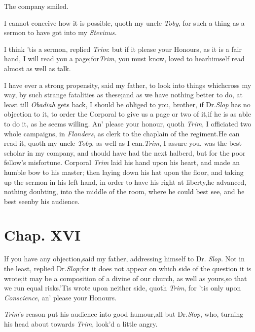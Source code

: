 \documentclass{article}
\begin{document}
The company smiled.

I cannot conceive how it is possible, quoth my uncle
\textit{Toby}, for such a thing as a sermon to have got into my
\textit{Stevinus.}

I think ’tis a sermon, replied \textit{Trim}:\tsk\break
but if it please your Honours, as it is a fair hand, I will read you a
page;\tsk for\break \textit{Trim}, you must know, loved to
hear\break himself
read almost as well as talk.

I have ever a strong propensity, said my father, to look into
things which\break cross my way, by such strange fatalities\break
as these;\tsk and as we have nothing better to do, at least
till \textit{Obadiah} gets back,\pb
I should be obliged to you, brother, if Dr.\@ \textit{Slop} has no
objection to it, to order the Corporal to give us a page or two of
it,\tsk if he is as able to do it, as he seems willing. An’
please your honour, quoth \textit{Trim}, I officiated two whole
campaigns, in \textit{Flanders}, as clerk to the chaplain of the
regiment.\tsh He can read it, quoth my uncle \textit{Toby},
as well as I can.\tsh \textit{Trim}, I assure you, was the
best scholar in my company, and should have had the next halberd,
but for the poor fellow’s mis\-fortune. Corporal \textit{Trim}
laid his hand upon his heart, and made an humble bow to his
master;\tsk
then laying down his hat upon the floor, and taking up the sermon
in his left hand, in order to have his right at liberty,\tsk he
advanced, nothing doubting, into the middle of the room, where he
could best see, and be best seen\break by his audience.

\newpage
\section{Chap. XVI}

\quad\tsh If you have any
objection,\tsk said my father, addressing himself to Dr.\@
\textit{Slop}.\break
Not in the least, replied Dr.\@ \textit{Slop};\tsk for
it does not appear on which side of the question it is
wrote;\tsk it may be a composition of a divine of our church, as
well as yours,\tsk so that we run equal
risks.\tsh ’Tis wrote upon neither side, quoth
\textit{Trim}, for ’tis only upon \textit{Conscience},\break
an’ please your Honours.

\textit{Trim}’s reason put his audience into good
humour,\tsk all but Dr.\@ \textit{Slop}, who,
turning his head about towards \textit{Trim},\break
look’d a little angry.
\end{document}

